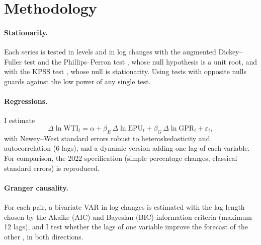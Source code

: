 \documentclass[11pt,a4paper]{article}
\newcommand{\dln}{\Delta\ln}
\begin{document}
\section{Methodology}\label{sec:method}

\paragraph{Stationarity.} Each series is tested in levels and in log changes with
the augmented Dickey--Fuller test \citep{dickey1979} and the Phillips--Perron
test \citep{phillips1988}, whose null hypothesis is a unit root, and with the
KPSS test \citep{kpss1992}, whose null is stationarity. Using tests with opposite
nulls guards against the low power of any single test.

\paragraph{Regressions.} I estimate
\begin{equation}
\dln \text{WTI}_t = \alpha + \beta_E\, \dln \text{EPU}_t + \beta_G\, \dln \text{GPR}_t + \varepsilon_t ,
\end{equation}
with Newey--West standard errors \citep{newey1987} robust to
heteroskedasticity and autocorrelation (6 lags), and a dynamic version adding
one lag of each variable. For comparison, the 2022 specification (simple
percentage changes, classical standard errors) is reproduced.

\paragraph{Granger causality.} For each pair, a bivariate VAR in log changes is
estimated with the lag length chosen by the Akaike (AIC) and Bayesian (BIC)
information criteria (maximum 12 lags), and I test whether the lags of one
variable improve the forecast of the other \citep{granger1969}, in both
directions.
\end{document}
